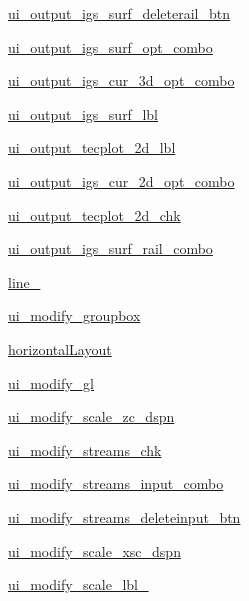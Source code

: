 \begin{DoxyCompactItemize}
\item 
\hyperlink{a00074_a5b1e25fc04ca17a3a8d6fbad21981539}{ui\+\_\+output\+\_\+igs\+\_\+surf\+\_\+deleterail\+\_\+btn}
\item 
\hyperlink{a00074_a42e57cade8b6c21d81aeee2be06bb581}{ui\+\_\+output\+\_\+igs\+\_\+surf\+\_\+opt\+\_\+combo}
\item 
\hyperlink{a00074_ad689a6c3856be67dc806b3334f032fb6}{ui\+\_\+output\+\_\+igs\+\_\+cur\+\_\+3d\+\_\+opt\+\_\+combo}
\item 
\hyperlink{a00074_afdd12bfad9e3808e8f183f9c5c1a7083}{ui\+\_\+output\+\_\+igs\+\_\+surf\+\_\+lbl}
\item 
\hyperlink{a00074_a33a702cecbba7090c938c1eabfd57669}{ui\+\_\+output\+\_\+tecplot\+\_\+2d\+\_\+lbl}
\item 
\hyperlink{a00074_aead15c2fb2cb4c70becfc3f7f5dc96bf}{ui\+\_\+output\+\_\+igs\+\_\+cur\+\_\+2d\+\_\+opt\+\_\+combo}
\item 
\hyperlink{a00074_a8f3110a97b17d4203ce917f6256fea2b}{ui\+\_\+output\+\_\+tecplot\+\_\+2d\+\_\+chk}
\item 
\hyperlink{a00074_a409bbf4eb732237d4d562061912c2f01}{ui\+\_\+output\+\_\+igs\+\_\+surf\+\_\+rail\+\_\+combo}
\item 
\hyperlink{a00074_a1a185947c45f1883377113ae7bb13bf3}{line\+\_}
\item 
\hyperlink{a00074_aa645e27296dab9e5638379386ea917e8}{ui\+\_\+modify\+\_\+groupbox}
\item 
\hyperlink{a00074_a26736563b6a21e18aa6259ad090095f6}{horizontal\+Layout}
\item 
\hyperlink{a00074_adbd7e377be21c4d3b65945e822f6d16a}{ui\+\_\+modify\+\_\+gl}
\item 
\hyperlink{a00074_a45676686abc65792ca2563bc755bf1fc}{ui\+\_\+modify\+\_\+scale\+\_\+zc\+\_\+dspn}
\item 
\hyperlink{a00074_a6d932026d0608e9101dc635e53e14b39}{ui\+\_\+modify\+\_\+streams\+\_\+chk}
\item 
\hyperlink{a00074_aa5c75d1179f2057b2870faeb125ba159}{ui\+\_\+modify\+\_\+streams\+\_\+input\+\_\+combo}
\item 
\hyperlink{a00074_a975e1c1c7915c37fc9a24064f29b0ba6}{ui\+\_\+modify\+\_\+streams\+\_\+deleteinput\+\_\+btn}
\item 
\hyperlink{a00074_a8a7176b6c27c85fb33c76775294b0b80}{ui\+\_\+modify\+\_\+scale\+\_\+xsc\+\_\+dspn}
\item 
\hyperlink{a00074_a86a79f9b08cfaf52544470b8392b2978}{ui\+\_\+modify\+\_\+scale\+\_\+lbl\+\_}
\item 

\end{DoxyCompactItemize}
